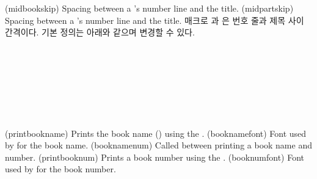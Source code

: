 \begin{syntax}
\cmd{\midbookskip} \\
\cmd{\midpartskip} \\
\end{syntax}
\glossary(midbookskip)%
  {}%
  {Spacing between a 's number line and the title.}
\glossary(midpartskip)%
  {}%
  {Spacing between a 's number line and the title.}
매크로 \cmd{\midbookskip}과 \cmd{\midpartskip}은 번호 줄과 제목 사이 간격이다.
기본 정의는 아래와 같으며 변경할 수 있다.
\begin{lcode}
\newcommand{\midbookskip}{\par\vspace 2\onelineskip}
\newcommand{\midpartskip}{\par\vspace 2\onelineskip}
\end{lcode}

\begin{syntax}
\cmd{\printbookname} \cmd{\booknamefont} \\
\cmd{\booknamenum} \\
\cmd{\printbooknum} \cmd{\booknumfont} \\
\cmd{\printpartname} \cmd{\partnamefont} \\
\cmd{\partnamenum} \\
\cmd{\printpartnum} \cmd{\partnumfont} \\
\end{syntax}
\glossary(printbookname)%
  {}
  {Prints the book name () using the .}
\glossary(booknamefont)%
  {}%
  {Font used by  for the book name.}
\glossary(booknamenum)%
  {}%
  {Called between printing a book name and number.}
\glossary(printbooknum)%
  {}%
  {Prints a book number using the .}
\glossary(booknumfont)%
  {}%
  {Font used by  for the book number.}

